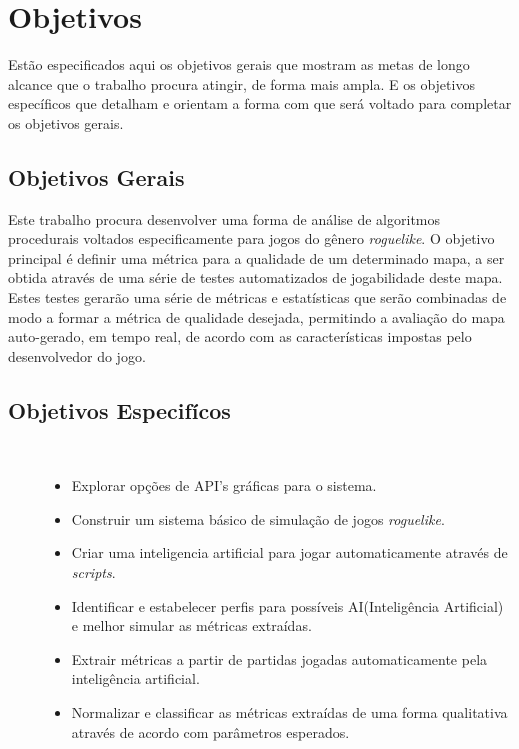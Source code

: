\chapter[Objetivos]{Objetivos}

Estão especificados aqui os objetivos gerais que mostram as metas de longo alcance que o trabalho procura atingir, de forma mais ampla. E os objetivos específicos que detalham e orientam a forma com que será voltado para completar os objetivos gerais.

\section{Objetivos Gerais}

Este trabalho procura desenvolver uma forma de análise de algoritmos procedurais voltados especificamente para jogos do gênero \textit{roguelike}. O objetivo principal é definir uma métrica para a qualidade de um determinado mapa, a ser obtida através de uma série de testes automatizados de jogabilidade deste mapa. Estes testes gerarão uma série de métricas e estatísticas que serão combinadas de modo a formar a métrica de qualidade desejada, permitindo a avaliação do mapa auto-gerado, em tempo real, de acordo com as características impostas pelo desenvolvedor do jogo. 

\section{Objetivos Especifícos}
\begin{description}
	\item [] \

	\begin{itemize}
		\item Explorar opções de API's gráficas para o sistema.
		\item Construir um sistema básico de simulação de jogos \textit{roguelike}.
		\item Criar uma inteligencia artificial para jogar automaticamente através de \textit{scripts}.
		\item Identificar e estabelecer perfis para possíveis AI(Inteligência Artificial) e melhor simular as métricas extraídas.
		\item Extrair métricas a partir de partidas jogadas automaticamente pela inteligência artificial.
		\item Normalizar e classificar as métricas extraídas de uma forma qualitativa através de acordo com parâmetros esperados.
		
	\end{itemize}
\end{description}
